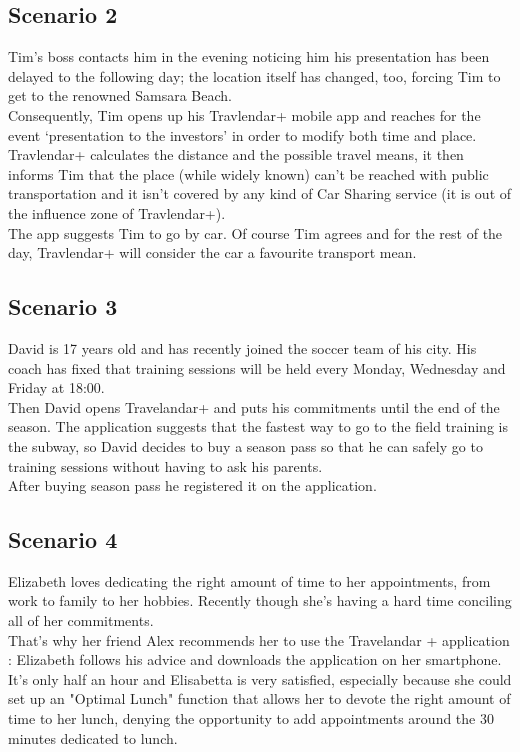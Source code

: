 \subsection{Scenario 2}

Tim’s boss contacts him in the evening noticing him his presentation has been delayed to the following day; the location itself has changed, too, forcing Tim to get to the renowned Samsara Beach.\\
Consequently, Tim opens up his Travlendar+ mobile app and reaches for the event ‘presentation to the investors’ in order to modify both time and place.\\
Travlendar+ calculates the distance and the possible travel means, it then informs Tim that the place (while widely known) can’t be reached with public transportation and it isn’t covered by any kind of Car Sharing service (it is out of the influence zone of Travlendar+).\\
The app suggests Tim to go by car. Of course Tim agrees and for the rest of the day, Travlendar+ will consider the car a favourite transport mean.

\subsection{Scenario 3}

David is 17 years old and has recently joined the soccer team of his city. His coach has fixed that training sessions will be held every Monday, Wednesday and Friday at 18:00.\\
Then David opens Travelandar+ and puts his commitments until the end of the season. The application suggests that the fastest way to go to the field training is the subway, so David decides to buy a season pass so that he can safely go to training sessions without having to ask his parents.\\
After buying season pass he registered it on the application.


\subsection{Scenario 4}

Elizabeth loves dedicating the right amount of time to her appointments, from work to family to her hobbies. Recently though she’s having a hard time conciling all of her commitments.\\ 
That’s why her friend Alex recommends her to use the Travelandar + application : Elizabeth follows his advice and downloads the application on her smartphone.\\
It’s only half an hour and Elisabetta is very satisfied, especially because she could set up an "Optimal Lunch" function that allows her to devote the right amount of time to her lunch, denying the opportunity to add appointments around the 30 minutes dedicated to lunch.

